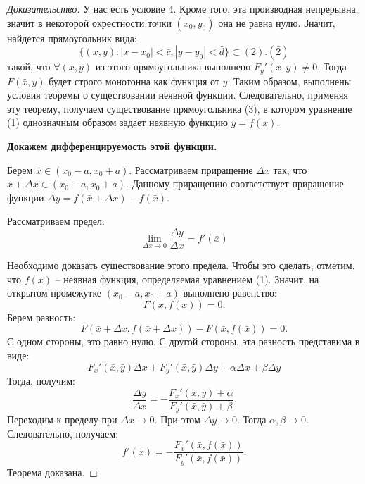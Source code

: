 \documentclass{article}
\theoremstyle{plain}
\theoremstyle{definition}
\theoremstyle{remark}
\begin{document}
\begin{proof}[Доказательство]
    У нас есть условие 4. Кроме того, эта производная непрерывна, значит
    в некоторой окрестности точки $(x_0, y_0)$ она не равна нулю.
    Значит, найдется прямоугольник вида:
    \[\{(x, y) : |x - x_0| < \bar{c}, |y - y_0| < \bar{d}\} \subset (2). (\bar{2})\]
    такой, что $\forall (x, y)$ из этого прямоугольника выполнено $F_y'(x, y) \neq 0$.
    Тогда $F(\bar{x}, y)$ будет строго монотонна как функция от $y$. Таким образом,
    выполнены условия теоремы о существовании неявной функции. Следовательно, применяя
    эту теорему, получаем существование прямоугольника (3), в котором уравнение (1)
    однозначным образом задает неявную функцию $y = f(x)$.

    \textbf{Докажем дифференцируемость этой функции.}

    Берем $\bar{x} \in (x_0 - a, x_0 + a)$. Рассматриваем приращение $\Delta x$ так,
    что $\bar{x} + \Delta x \in (x_0 - a, x_0 + a)$. Данному приращению соответствует
    приращение функции $\Delta y = f(\bar{x} + \Delta x) - f(\bar{x})$.

    Рассматриваем предел:
    \[\lim_{\Delta x \to 0} \frac{\Delta y}{\Delta x} = f'(\bar{x})\]

    Необходимо доказать существование этого предела. Чтобы это сделать, отметим,
    что $f(x)$ -- неявная функция, определяемая уравнением (1). Значит, на открытом
    промежутке $(x_0 - a, x_0 + a)$ выполнено равенство:
    \[F(x, f(x)) = 0.\]
    Берем разность:
    \[F(\bar{x} + \Delta x, f(\bar{x} + \Delta x)) - F(\bar{x}, f(\bar{x})) = 0.\]
    С одном стороны, это равно нулю. С другой стороны, эта разность представима в виде:
    \[F_x'(\bar{x}, \bar{y})\Delta x + F_y'(\bar{x}, \bar{y}) \Delta y + \alpha \Delta x + \beta \Delta y\]
    Тогда, получим:
    \[\frac{\Delta y}{\Delta x} = -\frac{F_x'(\bar{x}, \bar{y}) + \alpha}{F_y'(\bar{x}, \bar{y}) + \beta}.\]
    Переходим к пределу при $\Delta x \to 0$. При этом $\Delta y \to 0$.
    Тогда $\alpha, \beta \to 0$. Следовательно, получаем:
    \[f'(\bar{x}) = -\frac{F_x'(\bar{x}, f(\bar{x}))}{F_y'(\bar{x}, f(\bar{x}))}.\]
    Теорема доказана.
\end{proof}
\end{document}
